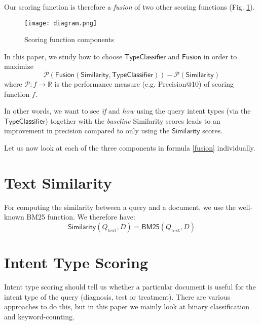 Our scoring function is therefore a \emph{fusion} of two other scoring functions (Fig. \ref{diagram}).

\begin{figure}[h!]
\centerline{
  \texttt{[image: diagram.png]}
  }
  \caption{Scoring function components}
  \label{diagram}
\end{figure}

In this paper, we study how to choose $\textsf{TypeClassifier}$ and $\textsf{Fusion}$ in order to maximize
\[
 \mathcal{P}(\textsf{Fusion}(\textsf{Similarity}, \textsf{TypeClassifier})) - \mathcal{P}(\textsf{Similarity})
\]
where $\mathcal{P}: f \rightarrow \mathbb{R}$ is the performance measure (e.g. Precision@10) of scoring function $f$.

In other words, we want to see \emph{if} and \emph{how} using the query intent types (via the
$\textsf{TypeClassifier}$) together with the \emph{baseline} \textsf{Similarity} scores
leads to an improvement in precision compared to only using the $\textsf{Similarity}$ scores.

Let us now look at each of the three components in formula \ref{fusion} individually.

\section{Text Similarity}
For computing the similarity between a query and a document, we use the well-known BM25 function\cite{bm25}.
We therefore have:
\begin{equation}\label{bm25-formula}
 \textsf{Similarity}(Q_{\text{text}}, D) = \textsf{BM25}(Q_{\text{text}},D)%
\end{equation}


\section{Intent Type Scoring}
Intent type scoring should tell us whether a particular document is useful for the intent type of the query 
(diagnosis, test or treatment). There are various approaches to do this, but in this paper we mainly look at
binary classification and keyword-counting.

